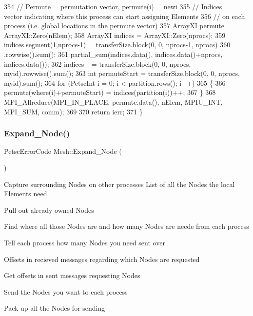 \begin{DoxyCode}
354   \textcolor{comment}{// Permute = permutation vector, permute(i) = newi}
355   \textcolor{comment}{// Indices = vector indicating where this process can start assigning Elements}
356   \textcolor{comment}{//            on each process (i.e. global locations in the permute vector)}
357   ArrayXI permute = ArrayXI::Zero(nElem);
358   ArrayXI indices = ArrayXI::Zero(nprocs);
359   indices.segment(1,nprocs-1) = transferSize.block(0, 0, nprocs-1, nprocs)
360                                 .rowwise().sum();
361   partial\_sum(indices.data(), indices.data()+nprocs, indices.data());
362   indices += transferSize.block(0, 0, nprocs, myid).rowwise().sum();
363   \textcolor{keywordtype}{int} permuteStart = transferSize.block(0, 0, nprocs, myid).sum();
364   \textcolor{keywordflow}{for} (PetscInt i = 0; i < partition.rows(); i++)
365   \{
366     permute(where(i)+permuteStart) = indices(partition(i))++;
367   \}
368   MPI\_Allreduce(MPI\_IN\_PLACE, permute.data(), nElem, MPIU\_INT, MPI\_SUM, comm);
369 
370   \textcolor{keywordflow}{return} ierr;
371 \}
\end{DoxyCode}
\mbox{\label{class_mesh_a1930d80c707de6d202dac7cef0022257}} 
\subsubsection{\texorpdfstring{Expand\+\_\+\+Node()}{Expand\_Node()}}
{\footnotesize\ttfamily Petsc\+Error\+Code Mesh\+::\+Expand\+\_\+\+Node (\begin{DoxyParamCaption}{ }\end{DoxyParamCaption})\hspace{0.3cm}{\ttfamily [protected]}}

Capture surrounding Nodes on other processes List of all the Nodes the local Elements need

Pull out already owned Nodes

Find where all those Nodes are and how many Nodes are neede from each process

Tell each process how many Nodes you need sent over

Offsets in recieved messages regarding which Nodes are requested

Get offsets in sent messages requesting Nodes

Send the Nodes you want to each process

Pack up all the Nodes for sending

